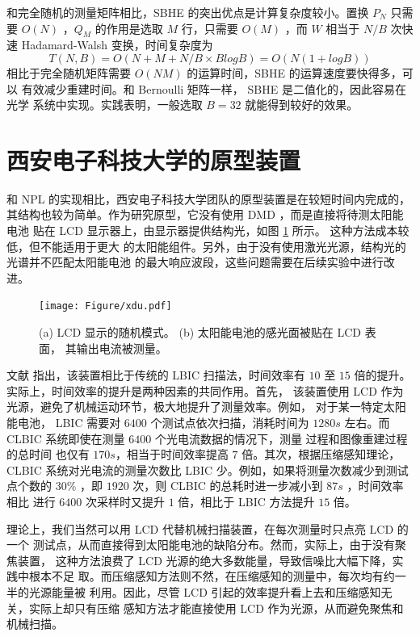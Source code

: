 和完全随机的测量矩阵相比，SBHE 的突出优点是计算复杂度较小。置换
$P_N$ 只需要 $O(N)$ ，$Q_M$ 的作用是选取 $M$ 行，只需要 $O(M)$ ，而
$W$ 相当于 $N/B$ 次快速 Hadamard-Walsh 变换，时间复杂度为
\begin{equation}
T(N,B) = O(N + M + N/B \times B log B) = O(N(1+logB))
\end{equation}
相比于完全随机矩阵需要 $O(NM)$ 的运算时间，SBHE 的运算速度要快得多，可以
有效减少重建时间。和 Bernoulli 矩阵一样， SBHE 是二值化的，因此容易在光学
系统中实现。实践表明，一般选取 $B=32$ 就能得到较好的效果。

\section{西安电子科技大学的原型装置}

和 NPL 的实现相比，西安电子科技大学团队的原型装置是在较短时间内完成的，
其结构也较为简单。作为研究原型，它没有使用 DMD ，而是直接将待测太阳能电池
贴在 LCD 显示器上，由显示器提供结构光，如图 \ref{fig:xdu} 所示。
这种方法成本较低，但不能适用于更大
的太阳能组件。另外，由于没有使用激光光源，结构光的光谱并不匹配太阳能电池
的最大响应波段，这些问题需要在后续实验中进行改进。

\begin{figure}
\centering
\texttt{[image: Figure/xdu.pdf]}
\caption{(a) LCD 显示的随机模式。 (b) 太阳能电池的感光面被贴在 LCD 表面，
其输出电流被测量。}
\label{fig:xdu}
\end{figure}

文献 \cite{XDUCLBIC} 指出，该装置相比于传统的 LBIC 扫描法，时间效率有
$10$ 至 $15$ 倍的提升。实际上，时间效率的提升是两种因素的共同作用。首先，
该装置使用 LCD 作为光源，避免了机械运动环节，极大地提升了测量效率。例如，
对于某一特定太阳能电池， LBIC 需要对 $6400$ 个测试点依次扫描，消耗时间为
$1280 s$ 左右。而 CLBIC 系统即使在测量 $6400$ 个光电流数据的情况下，测量
过程和图像重建过程的总时间
也仅有 $170 s$，相当于时间效率提高 $7$ 倍。其次，根据压缩感知理论， CLBIC
系统对光电流的测量次数比 LBIC 少。例如，如果将测量次数减少到测试点个数的
$30\%$ ，即 $1920$ 次，则 CLBIC 的总耗时进一步减小到 $87 s$ ，时间效率相比
进行 $6400$ 次采样时又提升 $1$ 倍，相比于 LBIC 方法提升 $15$ 倍。

理论上，我们当然可以用 LCD 代替机械扫描装置，在每次测量时只点亮 LCD 的一个
测试点，从而直接得到太阳能电池的缺陷分布。然而，实际上，由于没有聚焦装置，
这种方法浪费了 LCD 光源的绝大多数能量，导致信噪比大幅下降，实践中根本不足
取。而压缩感知方法则不然，在压缩感知的测量中，每次均有约一半的光源能量被
利用。因此，尽管 LCD 引起的效率提升看上去和压缩感知无关，实际上却只有压缩
感知方法才能直接使用 LCD 作为光源，从而避免聚焦和机械扫描。

